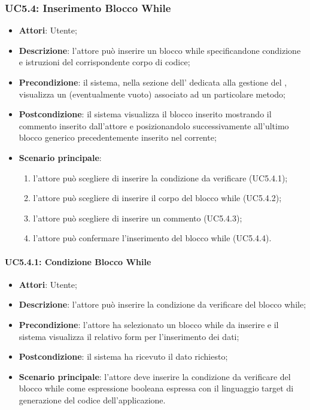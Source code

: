 \subsubsection{UC5.4: Inserimento Blocco While}
\label{UC5.4}
\begin{itemize}
\item \textbf{Attori}: Utente;
\item \textbf{Descrizione}: l'attore può inserire un blocco while specificandone condizione e istruzioni del corrispondente corpo di codice;	
\item \textbf{Precondizione}: il sistema, nella sezione dell' dedicata alla gestione del , visualizza un  (eventualmente vuoto) associato ad un particolare metodo;	
\item \textbf{Postcondizione}: il sistema visualizza il blocco inserito mostrando il commento inserito dall'attore e posizionandolo successivamente all'ultimo blocco generico precedentemente inserito nel  corrente;	
\item \textbf{Scenario principale}:
\begin{enumerate}
\item l'attore può scegliere di inserire la condizione da verificare (UC5.4.1);
\item l'attore può scegliere di inserire il corpo del blocco while (UC5.4.2);
\item l'attore può scegliere di inserire un commento (UC5.4.3);
\item l'attore può confermare l'inserimento del blocco while (UC5.4.4).
\end{enumerate}
\end{itemize}

\paragraph{UC5.4.1: Condizione Blocco While	}
\label{UC5.4.1}
\begin{itemize}
\item \textbf{Attori}: Utente;
\item \textbf{Descrizione}: l'attore può inserire la condizione da verificare del blocco while;	
\item \textbf{Precondizione}: l'attore ha selezionato un blocco while da inserire e il sistema visualizza il relativo form per l'inserimento dei dati;
\item \textbf{Postcondizione}: il sistema ha ricevuto il dato richiesto;	
\item \textbf{Scenario principale}:
l'attore deve inserire la condizione da verificare del blocco while come espressione booleana espressa con il linguaggio target di generazione del codice dell'applicazione.
\end{itemize}

